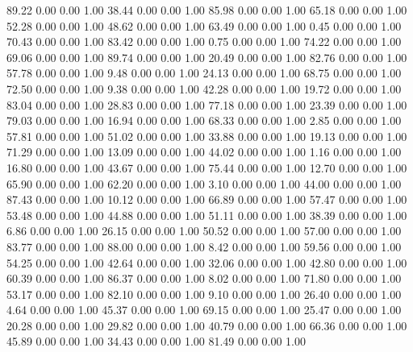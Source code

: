    89.22   0.00   0.00   1.00
   38.44   0.00   0.00   1.00
   85.98   0.00   0.00   1.00
   65.18   0.00   0.00   1.00
   52.28   0.00   0.00   1.00
   48.62   0.00   0.00   1.00
   63.49   0.00   0.00   1.00
    0.45   0.00   0.00   1.00
   70.43   0.00   0.00   1.00
   83.42   0.00   0.00   1.00
    0.75   0.00   0.00   1.00
   74.22   0.00   0.00   1.00
   69.06   0.00   0.00   1.00
   89.74   0.00   0.00   1.00
   20.49   0.00   0.00   1.00
   82.76   0.00   0.00   1.00
   57.78   0.00   0.00   1.00
    9.48   0.00   0.00   1.00
   24.13   0.00   0.00   1.00
   68.75   0.00   0.00   1.00
   72.50   0.00   0.00   1.00
    9.38   0.00   0.00   1.00
   42.28   0.00   0.00   1.00
   19.72   0.00   0.00   1.00
   83.04   0.00   0.00   1.00
   28.83   0.00   0.00   1.00
   77.18   0.00   0.00   1.00
   23.39   0.00   0.00   1.00
   79.03   0.00   0.00   1.00
   16.94   0.00   0.00   1.00
   68.33   0.00   0.00   1.00
    2.85   0.00   0.00   1.00
   57.81   0.00   0.00   1.00
   51.02   0.00   0.00   1.00
   33.88   0.00   0.00   1.00
   19.13   0.00   0.00   1.00
   71.29   0.00   0.00   1.00
   13.09   0.00   0.00   1.00
   44.02   0.00   0.00   1.00
    1.16   0.00   0.00   1.00
   16.80   0.00   0.00   1.00
   43.67   0.00   0.00   1.00
   75.44   0.00   0.00   1.00
   12.70   0.00   0.00   1.00
   65.90   0.00   0.00   1.00
   62.20   0.00   0.00   1.00
    3.10   0.00   0.00   1.00
   44.00   0.00   0.00   1.00
   87.43   0.00   0.00   1.00
   10.12   0.00   0.00   1.00
   66.89   0.00   0.00   1.00
   57.47   0.00   0.00   1.00
   53.48   0.00   0.00   1.00
   44.88   0.00   0.00   1.00
   51.11   0.00   0.00   1.00
   38.39   0.00   0.00   1.00
    6.86   0.00   0.00   1.00
   26.15   0.00   0.00   1.00
   50.52   0.00   0.00   1.00
   57.00   0.00   0.00   1.00
   83.77   0.00   0.00   1.00
   88.00   0.00   0.00   1.00
    8.42   0.00   0.00   1.00
   59.56   0.00   0.00   1.00
   54.25   0.00   0.00   1.00
   42.64   0.00   0.00   1.00
   32.06   0.00   0.00   1.00
   42.80   0.00   0.00   1.00
   60.39   0.00   0.00   1.00
   86.37   0.00   0.00   1.00
    8.02   0.00   0.00   1.00
   71.80   0.00   0.00   1.00
   53.17   0.00   0.00   1.00
   82.10   0.00   0.00   1.00
    9.10   0.00   0.00   1.00
   26.40   0.00   0.00   1.00
    4.64   0.00   0.00   1.00
   45.37   0.00   0.00   1.00
   69.15   0.00   0.00   1.00
   25.47   0.00   0.00   1.00
   20.28   0.00   0.00   1.00
   29.82   0.00   0.00   1.00
   40.79   0.00   0.00   1.00
   66.36   0.00   0.00   1.00
   45.89   0.00   0.00   1.00
   34.43   0.00   0.00   1.00
   81.49   0.00   0.00   1.00
